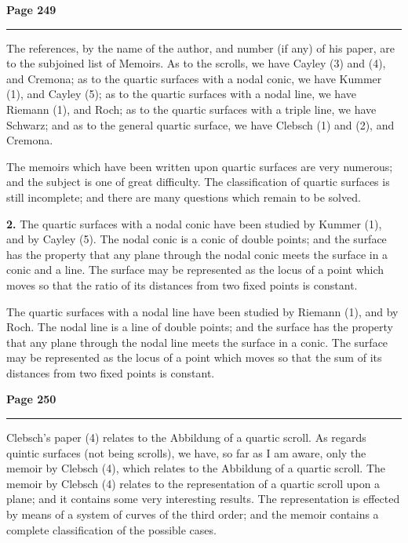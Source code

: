 \documentclass[12pt,a4paper]{article}
\theoremstyle{plain}
\theoremstyle{definition}
\theoremstyle{remark}
\begin{document}
\newpage
\noindent\textbf{Page 249}\\
\noindent\rule{\textwidth}{0.4pt}

\smallskip

\noindent The references, by the name of the author, and number (if any) of his paper, are to the subjoined list of Memoirs. As to the scrolls, we have Cayley (3) and (4), and Cremona; as to the quartic surfaces with a nodal conic, we have Kummer (1), and Cayley (5); as to the quartic surfaces with a nodal line, we have Riemann (1), and Roch; as to the quartic surfaces with a triple line, we have Schwarz; and as to the general quartic surface, we have Clebsch (1) and (2), and Cremona.

\noindent The memoirs which have been written upon quartic surfaces are very numerous; and the subject is one of great difficulty. The classification of quartic surfaces is still incomplete; and there are many questions which remain to be solved.

\noindent\textbf{2.} The quartic surfaces with a nodal conic have been studied by Kummer (1), and by Cayley (5). The nodal conic is a conic of double points; and the surface has the property that any plane through the nodal conic meets the surface in a conic and a line. The surface may be represented as the locus of a point which moves so that the ratio of its distances from two fixed points is constant.

\noindent The quartic surfaces with a nodal line have been studied by Riemann (1), and by Roch. The nodal line is a line of double points; and the surface has the property that any plane through the nodal line meets the surface in a conic. The surface may be represented as the locus of a point which moves so that the sum of its distances from two fixed points is constant.

\newpage
\noindent\textbf{Page 250}\\
\noindent\rule{\textwidth}{0.4pt}

\smallskip

\noindent Clebsch's paper (4) relates to the Abbildung of a quartic scroll. As regards quintic surfaces (not being scrolls), we have, so far as I am aware, only the memoir by Clebsch (4), which relates to the Abbildung of a quartic scroll. The memoir by Clebsch (4) relates to the representation of a quartic scroll upon a plane; and it contains some very interesting results. The representation is effected by means of a system of curves of the third order; and the memoir contains a complete classification of the possible cases.
\end{document}
